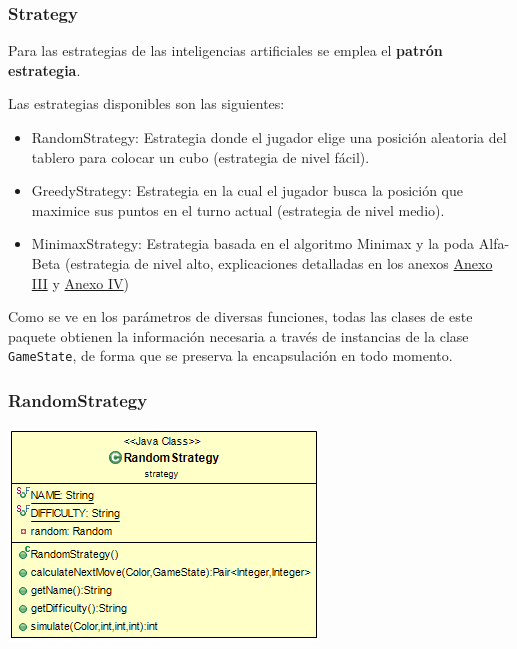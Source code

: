 \documentclass[12pt,a4paper,openright]{book}
\theoremstyle{break}
\begin{document}
\newpage

\subsubsection{Strategy}

Para las estrategias de las inteligencias artificiales se emplea el \textbf{patrón estrategia}.

Las estrategias disponibles son las siguientes:

\begin{itemize}
\item RandomStrategy: Estrategia donde el jugador elige una posición aleatoria del tablero para colocar un cubo (estrategia de nivel fácil).
\item GreedyStrategy: Estrategia en la cual el jugador busca la posición que maximice sus puntos en el turno actual (estrategia de nivel medio).
\item MinimaxStrategy: Estrategia basada en el algoritmo Minimax y la poda Alfa-Beta (estrategia de nivel alto, explicaciones detalladas en los anexos \hyperref[ch:AnexoIII]{Anexo III} y \hyperref[ch:AnexoIV]{Anexo IV}) 
\end{itemize}

Como se ve en los parámetros de diversas funciones, todas las clases de este paquete obtienen la información necesaria a través de instancias de la clase \texttt{GameState}, de forma que se preserva la encapsulación en todo momento.

\newpage

\subsubsection{RandomStrategy}

\begin{center}
\includegraphics[scale=0.75]{RandomStrategy-sprint7.png} 
\end{center}
\end{document}
